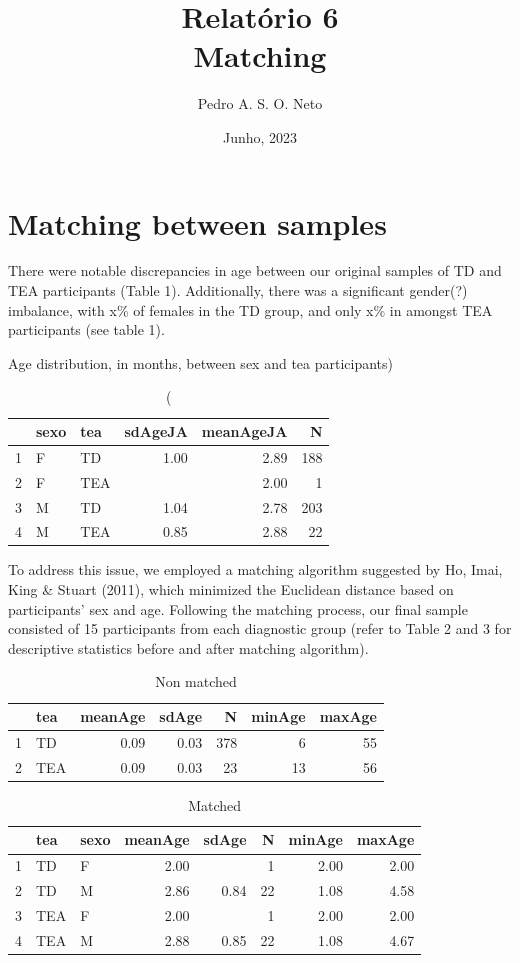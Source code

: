 \documentclass{article}
\title{Relatório 6 \\ Matching}
\author{Pedro A. S. O. Neto}
\date{Junho, 2023}
\begin{document}
\maketitle

\section{Matching between samples}

There were notable discrepancies in age between our original samples of TD and TEA participants (Table 1). Additionally, there was a significant gender(?) imbalance, with x\% of females in the TD group, and only x\% in amongst TEA participants (see table 1).

\begin{table}[ht]
\caption(Age distribution, in months, between sex and tea participants)
\centering
\begin{tabular}{rllrrr}
  \hline
 & sexo & tea & sdAgeJA & meanAgeJA & N \\ 
  \hline
1 & F & TD & 1.00 & 2.89 & 188 \\ 
  2 & F & TEA &  & 2.00 &   1 \\ 
  3 & M & TD & 1.04 & 2.78 & 203 \\ 
  4 & M & TEA & 0.85 & 2.88 &  22 \\ 
   \hline
\end{tabular}
\end{table}

To address this issue, we employed a matching algorithm suggested by Ho, Imai, King \& Stuart (2011), which minimized the Euclidean distance based on participants' sex and age. Following the matching process, our final sample consisted of 15 participants from each diagnostic group (refer to Table 2 and 3 for descriptive statistics before and after matching algorithm).

\begin{table}[ht]
\caption{Non matched}
\centering
\begin{tabular}{rlrrrrr}
  \hline
 & tea & meanAge & sdAge & N & minAge & maxAge \\ 
  \hline
1 & TD & 0.09 & 0.03 & 378 &   6 &  55 \\ 
  2 & TEA & 0.09 & 0.03 &  23 &  13 &  56 \\ 
   \hline
\end{tabular}
\end{table}

\begin{table}[ht]
\caption{Matched}
\centering
\begin{tabular}{rllrrrrr}
  \hline
 & tea & sexo & meanAge & sdAge & N & minAge & maxAge \\ 
  \hline
1 & TD & F & 2.00 &  &   1 & 2.00 & 2.00 \\ 
  2 & TD & M & 2.86 & 0.84 &  22 & 1.08 & 4.58 \\ 
  3 & TEA & F & 2.00 &  &   1 & 2.00 & 2.00 \\ 
  4 & TEA & M & 2.88 & 0.85 &  22 & 1.08 & 4.67 \\ 
   \hline
\end{tabular}
\end{table}
\end{document}
